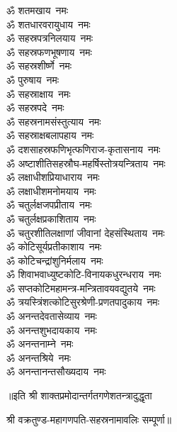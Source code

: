 \begin{multicols}{2}
\begin{flushleft}
ॐ शतमखाय~नमः\\
ॐ शतधारवरायुधाय~नमः\\
ॐ सहस्रपत्रनिलयाय~नमः\\
ॐ सहस्रफणभूषणाय~नमः\\
ॐ सहस्रशीर्ष्णे~नमः\\
ॐ पुरुषाय~नमः\\
ॐ सहस्राक्षाय~नमः\\
ॐ सहस्रपदे~नमः\\
ॐ सहस्रनामसंस्तुत्याय~नमः\hfill{}\\
ॐ सहस्राक्षबलापहाय~नमः\\
ॐ दशसाहस्रफणिभृत्फणिराज-कृतासनाय~नमः\\
ॐ अष्टाशीतिसहस्रौघ-महर्षिस्तोत्रयन्त्रिताय~नमः\\
ॐ लक्षाधीशप्रियाधाराय~नमः\\
ॐ लक्षाधीशमनोमयाय~नमः\\
ॐ चतुर्लक्षजपप्रीताय~नमः\\
ॐ चतुर्लक्षप्रकाशिताय~नमः\\
ॐ चतुरशीतिलक्षाणां जीवानां देहसंस्थिताय~नमः\\
ॐ कोटिसूर्यप्रतीकाशाय~नमः\\
ॐ कोटिचन्द्रांशुनिर्मलाय~नमः\hfill{}\\
ॐ शिवाभवाध्युष्टकोटि-विनायकधुरन्धराय~नमः\\
ॐ सप्तकोटिमहामन्त्र-मन्त्रितावयवद्युतये~नमः\\
ॐ त्रयस्त्रिंशत्कोटिसुरश्रेणी-प्रणतपादुकाय~नमः\\
ॐ अनन्तदेवतासेव्याय~नमः\\
ॐ अनन्तशुभदायकाय~नमः\\
ॐ अनन्तनाम्ने~नमः\\
ॐ अनन्तश्रिये~नमः\\
ॐ अनन्तानन्तसौख्यदाय~नमः\\
\end{flushleft}
\end{multicols}
॥इति श्री शाक्तप्रमोदान्तर्गतगणेशतन्त्रादुद्धृता

श्री वक्रतुण्ड-महागणपति-सहस्रनामावलिः सम्पूर्णा॥
